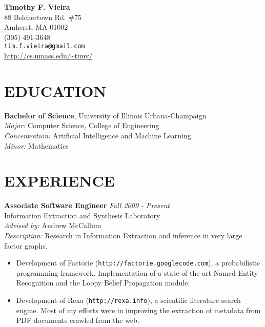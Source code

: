 \documentclass{report}
\newcommand{\centerheader}[1]{\moveleft.5\hoffset\centerline{#1}}
\begin{document}
{
  {\vskip 0.2in}
  {\Large \bf Timothy F. Vieira} \\
  88 Belchertown Rd. \#75 \\
  Amherst, MA 01002 \\
  (305) 491-3648 \\
  \texttt{tim.f.vieira@gmail.com} \\
  \url{http://cs.umass.edu/~timv/} \\
}

{\vskip 0.1in}



\section*{EDUCATION} 
{\bf Bachelor of Science}, University of Illinois Urbana-Champaign \\
{\sl Major:} Computer Science, College of Engineering \\
{\sl Concentration:} Artificial Intelligence and Machine Learning \\
{\sl Minor:} Mathematics

\section*{EXPERIENCE}
{\bf Associate Software Engineer} \hfill {\it Fall 2009 - Present} \\
Information Extraction and Synthesis Laboratory \\
{\sl Advised by:} Andrew McCallum \\
{\sl Description:} Research in Information Extraction and inference in very large factor graphs. 
\begin{itemize}
\item Development of Factorie (\texttt{http://factorie.googlecode.com}), a probabilistic programming framework. Implementation of a state-of-the-art Named Entity Recognition and the Loopy Belief Propagation module. 
\item Development of Rexa (\texttt{http://rexa.info}), a scientific literature search engine. Most of my efforts were in improving the extraction of metadata from PDF documents crawled from the web.
\end{itemize}
\end{document}
